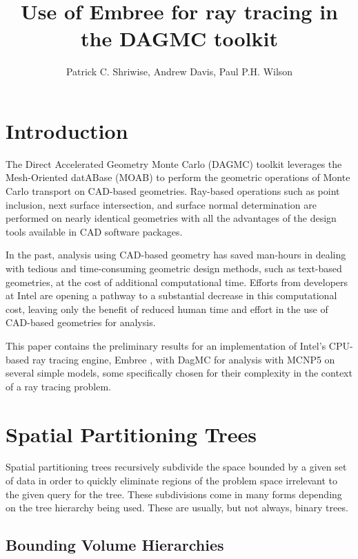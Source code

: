 \documentclass{anstrans}
\title{Use of Embree for ray tracing in the DAGMC toolkit}
\author{Patrick C. Shriwise, Andrew Davis, Paul P.H. Wilson}
\institute{University of Wisconsin-Madison, 1500 Engineering Dr, Madison, WI 53706, shriwise@wisc.edu}
\begin{document}
\section{Introduction}

The Direct Accelerated Geometry Monte Carlo (DAGMC) \cite{dagmc_2009} toolkit leverages the Mesh-Oriented datABase (MOAB) \cite{moab} to perform the geometric operations of Monte Carlo transport on CAD-based geometries. Ray-based operations such as point inclusion, next surface intersection, and surface normal determination are performed on nearly identical geometries with all the advantages of the design tools available in CAD software packages.

In the past, analysis using CAD-based geometry has saved man-hours in dealing with tedious and time-consuming geometric design methods, such as text-based geometries, at the cost of additional computational time. Efforts from developers at Intel are opening a pathway to a substantial decrease in this computational cost, leaving only the benefit of reduced human time and effort in the use of CAD-based geometries for analysis. 

This paper contains the preliminary results for an implementation of Intel's CPU-based ray tracing engine, Embree \cite{embree}, with DagMC for analysis with MCNP5 \cite{mcnp5} on several simple models, some specifically chosen for their complexity in the context of a ray tracing problem.

\section{Spatial Partitioning Trees}

Spatial partitioning trees recursively subdivide the space bounded by a given set of data in order to quickly eliminate regions of the problem space irrelevant to the given query for the tree. These subdivisions come in many forms depending on the tree hierarchy being used. These are usually, but not always, binary trees.


\subsection{Bounding Volume Hierarchies}
\end{document}
